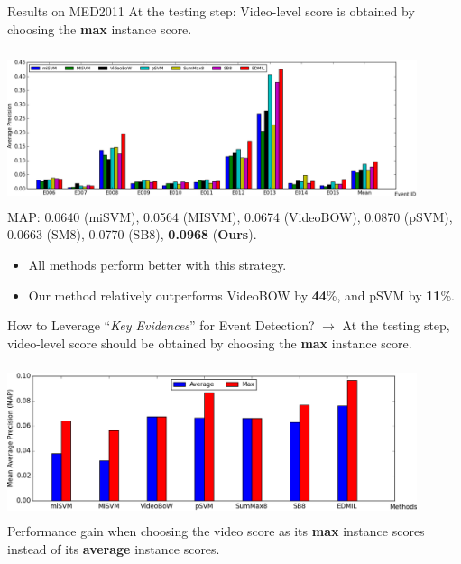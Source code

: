 \documentclass{beamer}
\begin{document}
\begin{frame}{Results on MED2011} 	
At the testing step: Video-level score is obtained by choosing the \textbf{max} instance score.	
	\begin{center}
		\includegraphics[width=12cm,height=4.5cm]{images/part4/max_med11_2.png}
		\\
		\tiny{MAP: 0.0640 (miSVM), 0.0564 (MISVM), 0.0674 (VideoBOW), 0.0870 (pSVM), 0.0663 (SM8), 0.0770 (SB8), \textbf{0.0968} (\textbf{Ours}).}
	\end{center}
	
	\begin{itemize}
		\item All methods perform better with this strategy.
		\item Our method relatively outperforms VideoBOW by \textbf{44}\%, and pSVM by \textbf{11}\%. 	
	\end{itemize}
	
\end{frame}	

\begin{frame}{How to Leverage ``\textit{Key Evidences}'' for Event Detection?} 	
	$\rightarrow$ At the testing step, video-level score should be obtained by choosing the \textbf{max} instance score.	
	\begin{center}
		\includegraphics[width=12cm,height=4.5cm]{images/part4/summaxgain.png}
		\\
		Performance gain when choosing the video score as its \textbf{max} instance scores instead of its \textbf{average} instance scores.
	\end{center}
	
\end{frame}	
\end{document}
